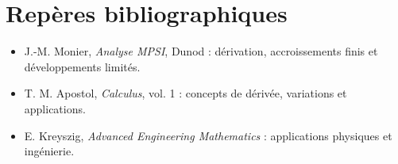 \documentclass[11pt,a4paper,oneside]{article}
\begin{document}
\section*{Repères bibliographiques}
\begin{itemize}
\item J.-M. Monier, \emph{Analyse MPSI}, Dunod : dérivation, accroissements finis et développements limités.
\item T. M. Apostol, \emph{Calculus}, vol. 1 : concepts de dérivée, variations et applications.
\item E. Kreyszig, \emph{Advanced Engineering Mathematics} : applications physiques et ingénierie.
\end{itemize}
\end{document}

